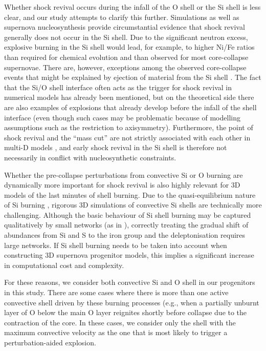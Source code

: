 \documentclass[useAMS,usenatbib]{mnras}
\begin{document}
Whether shock revival occurs during the infall of the O shell or the
Si shell is less clear, and our study attempts to clarify this
further.  Simulations as well as supernova nucleosynthesis provide
circumstantial evidence that shock revival generally does not occur in the Si
shell.  Due to the significant neutron excess, explosive burning in
the Si shell would lead, for example, to higher Ni/Fe ratios than
required for chemical evolution \citep{arnett_96} and than
observed for most core-collapse supernovae. There are, however,
exceptions among the observed core-collapse events that might be
explained by ejection of material from the Si shell
\citep{jerkstrand_15b}. The fact that the Si/O shell interface often
acts as the trigger for shock revival in numerical models has already been mentioned, but
on the theoretical side there are also examples \citep{mueller_12b} of
explosions that already develop before the infall of the shell
interface (even though such cases may be problematic because of
modelling assumptions such as the restriction to axisymmetry). Furthermore, the point of
shock revival and the ``mass cut'' are not strictly associated with each other in multi-D models \citep{harris_17,wanajo_17}, and early shock revival
in the Si shell is therefore not necessarily
in conflict with nucleosynthetic constraints.



Whether the pre-collapse perturbations from convective Si or O burning
are dynamically more important for shock revival is also highly
relevant for 3D models of the last minutes of shell burning. Due to
the quasi-equilibrium nature of Si burning \citep{bodansky_68,woosley_73,hix_96}, rigorous 3D
simulations of convective Si shells are technically more
challenging. Although the basic behaviour of Si shell burning may be
captured qualitatively by small networks (as in \citealt{couch_15}),
correctly treating the gradual shift of abundances from Si and S to
the iron group and the deleptonisation requires large networks. If Si
shell burning needs to be taken into account when constructing 3D
supernova progenitor models, this implies a significant increase in
computational cost and complexity.

For these reasons, we consider both convective Si and O shell
in our progenitors in this study. There are some cases where
there is more than one active convective shell driven by these burning processes
(e.g., when a partially unburnt layer of O below the main O layer reignites
shortly before collapse due to the contraction of the core.
In these cases, we consider only the shell with the maximum
convective velocity as the one that is most likely to trigger
a perturbation-aided explosion.  
\end{document}
